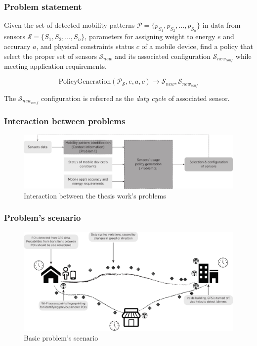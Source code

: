 \documentclass[compress,9pt,xcolor={dvipsnames,table}]{beamer}
\begin{document}
\begin{frame}\frametitle{Problem statement}
\begin{tcolorbox}[title=Problem statement: Policy generation,colframe=PineGreen]
\small
Given the set of detected mobility patterns $\mathcal{P} = \{ p_{S_1}, p_{S_2}, \ldots, p_{S_n} \}$ in data from sensors $\mathcal{S} = \{ S_1,S_2,\ldots, S_n \}$, parameters for assigning weight to energy $e$ and accuracy $a$, and physical constraints status $c$ of a mobile device, find a policy that select the proper set of sensors $\mathcal{S}_{new}$ and its associated configuration $\mathcal{S}_{new_{conf}}$  while meeting application requirements.

\begin{equation}
  \text{PolicyGeneration}( \mathcal{P}_{\mathcal{S}}, e, a, c ) \longrightarrow{} \mathcal{S}_{new}, \mathcal{S}_{new_{conf}}
\end{equation}

The $\mathcal{S}_{new_{conf}}$ configuration is referred as the \emph{duty cycle} of associated sensor.
\end{tcolorbox}
\end{frame}

\begin{frame}\frametitle{Interaction between problems}
\begin{figure}[tb]
  \centering
  \includegraphics[width=\textwidth]{../../../resources/images/vectors/problems-incorporation}
  \caption{Interaction between the thesis work's problems}
  \label{fig:probems-incorporation}
\end{figure}
\end{frame}

\begin{frame}[t]\frametitle{Problem's scenario}
\begin{figure}[tb]
  \centering
  \includegraphics[width=\textwidth]{../../../resources/images/vectors/scenario}
  \caption{Basic problem's scenario}
  \label{fig:scenario}
\end{figure}
\end{frame}
\end{document}
